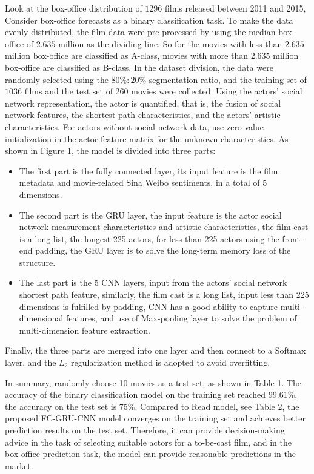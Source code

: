 \documentclass[review]{cvpr}
\begin{document}
Look at the box-office distribution of $1296$ films released between 2011 and 2015,
Consider box-office forecasts as a binary classification task.
To make the data evenly distributed, the film data were pre-processed by using the median box-office of $2.635$ million as the dividing line.
So for the movies with  less than $2.635$ million box-office are classified as A-class, movies with more than $2.635$ million box-office are classified as B-class.
In the dataset division, the data were randomly selected using the $80\%:20\%$ segmentation ratio, and the training set of $1036$ films and the test set of $260$ movies were collected.
Using the actors' social network representation, the actor is quantified, that is,
the fusion of social network features, the shortest path characteristics, and the actors' artistic characteristics.
For actors without social network data, use zero-value initialization in the actor feature matrix for the unknown characteristics.
As shown in Figure 1, the model is divided into three parts:

\begin{itemize}
\item The first part is the fully connected layer, its input feature is the film metadata and movie-related Sina Weibo sentiments, in a total of 5 dimensions.
\item The second part is the GRU layer, the input feature is the actor social network measurement characteristics and artistic characteristics, the film cast is a long list,
the longest 225 actors, for less than 225 actors using the front-end padding, the GRU layer is to solve the long-term memory loss of the structure.
\item The last part is the 5 CNN layers, input from the actors' social network shortest path feature, similarly, the film cast is a long list,
input less than 225 dimensions is fulfilled by padding, CNN has a good ability to capture multi-dimensional features, and use of Max-pooling layer to solve the problem of multi-dimension feature extraction.
\end{itemize}
Finally, the three parts are merged into one layer and then connect to a Softmax layer, and the $L_2$ regularization method is adopted to avoid overfitting.


In summary, randomly choose 10 movies as a test set, as shown in Table 1.
The accuracy of the binary classification model on the training set reached 99.61\%, the accuracy on the test set is 75\%.
Compared to Read \etal model, see Table 2, the proposed FC-GRU-CNN model converges on the training set and achieves better prediction results on the test set.
Therefore, it can provide decision-making advice in the task of selecting suitable actors for a to-be-cast film,
and in the box-office prediction task, the model can provide reasonable predictions in the market.
\end{document}
